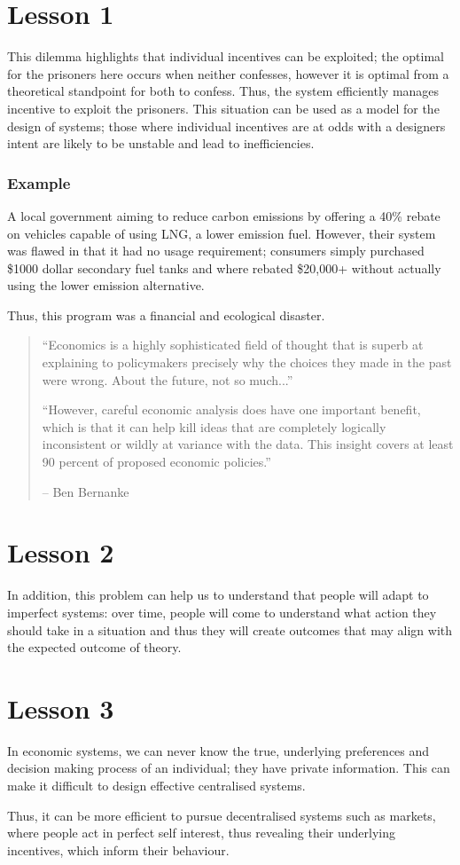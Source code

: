\documentclass[12pt]{report}
\begin{document}
\begin{flushleft}
\section*{Lesson 1}
This dilemma highlights that individual incentives can be exploited; the optimal for the prisoners here occurs when neither confesses,
however it is optimal from a theoretical standpoint for both to confess. Thus, the system efficiently manages
incentive to exploit the prisoners. This situation can be used as a model for the design of systems; those where
individual incentives are at odds with a designers intent are likely to be unstable and lead to inefficiencies.

\subsubsection{Example}
A local government aiming to reduce carbon emissions by offering a 40\% rebate on vehicles capable 
of using LNG, a lower emission fuel. However, their system was flawed in that it had no usage requirement;
consumers simply purchased \$1000 dollar secondary fuel tanks and where rebated \$20,000+ without actually
using the lower emission alternative.
\par
Thus, this program was a financial and ecological disaster.

\begin{quotation}
``Economics is a highly sophisticated field of thought that is superb at explaining to policymakers precisely 
why the choices they made in the past were wrong. About the future, not so much...''
\par
``However, careful economic analysis does have one important benefit, which is that it can help kill ideas that are completely
logically inconsistent or wildly at variance with the data. This insight covers at least 90 percent of proposed economic policies.''
\par
-- Ben Bernanke
\end{quotation}

\section*{Lesson 2}
In addition, this problem can help us to understand that people will adapt to imperfect systems:
over time, people will come to understand what action they should take in a situation and thus they
will create outcomes that may align with the expected outcome of theory.

\section*{Lesson 3}
In economic systems, we can never know the true, underlying preferences and decision 
making process of an individual; they have private information. This can make it difficult
to design effective centralised systems.
\par
Thus, it can be more efficient to pursue decentralised systems such as markets,
where people act in perfect self interest, thus revealing their underlying incentives, which 
inform their behaviour.


\end{flushleft}
\end{document}
